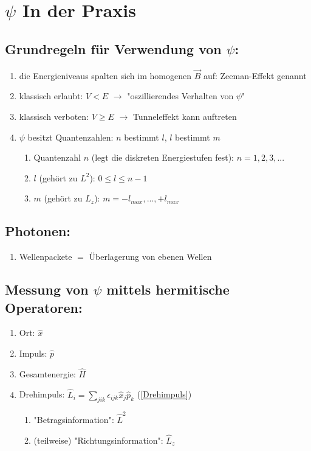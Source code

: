 \section{$\psi$ In der Praxis}

\subsection{Grundregeln für Verwendung von $\psi$:}
\begin{enumerate}
    \item die Energieniveaus spalten sich im homogenen $\vec{B}$ auf: Zeeman-Effekt genannt
    \item klassisch erlaubt: $V<E$ $\rightarrow$ "oszillierendes Verhalten von $\psi$"
    \item klassisch verboten: $V\geq E$ $\rightarrow$ Tunneleffekt kann auftreten 
    \item $\psi$ besitzt Quantenzahlen: $n$ bestimmt $l$, $l$ bestimmt $m$
    \begin{enumerate}
        \item Quantenzahl $n$ (legt die diskreten Energiestufen fest): $n=1,2,3,...$
        \item $l$ (gehört zu $L^2$): $0\leq l\leq n-1$
        \item $m$ (gehört zu $L_z$): $m=-l_{max},...,+l_{max}$ 
    \end{enumerate}
\end{enumerate}

\subsection{Photonen:}
\begin{enumerate}
    \item Wellenpackete $=$ Überlagerung von ebenen Wellen
\end{enumerate}

\subsection{Messung von $\psi$ mittels hermitische Operatoren:} \label{Operatoren}
\begin{enumerate}
    \item Ort: $\hat{x}$
    \item Impuls: $\hat{p}$
    \item Gesamtenergie: $\hat{H}$
    \item Drehimpuls: $\hat{L}_i=\sum_{jik}\epsilon_{ijk}\hat{x}_j\hat{p}_k$ (\ref{Drehimpuls})
    \begin{enumerate}
        \item "Betragsinformation": $\hat{L}^2$
        \item (teilweise) "Richtungsinformation": $\hat{L}_z$
    \end{enumerate}

\end{enumerate}

